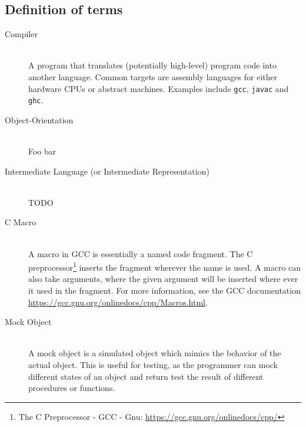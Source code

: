 
\subsection{Definition of terms}
\begin{description}
\item[Compiler] \hfill \\
  A program that translates (potentially high-level) program code into
  another language. Common targets are assembly languages for either
  hardware CPUs or abstract machines. Examples include
  \texttt{gcc}\cite{NEEDED}, \texttt{javac}\cite{NEEDED} and
  \texttt{ghc}\cite{NEEDED}.

\item[Object-Orientation] \hfill \\
  Foo bar

\item[Intermediate Language (or Intermediate Representation)] \hfill \\
  TODO

\item[C Macro] \hfill \\
  A macro in GCC is essentially a named code fragment. The C
  preprocessor\footnote{The C Preprocessor - GCC - Gnu:
    \url{https://gcc.gnu.org/onlinedocs/cpp/}} inserts the fragment
  wherever the name is used. A macro can also take arguments, where
  the given argument will be inserted where ever it used in the
  fragment. For more information, see the GCC documentation
  \url{https://gcc.gnu.org/onlinedocs/cpp/Macros.html}.

\item[Mock Object] \hfill \\
  A mock object is a simulated object which mimics the behavior of the
  actual object. This is useful for testing, as the programmer can
  mock different states of an object and return test the result of
  different procedures or functions. %

\end{description}


\label{sec:spec}

